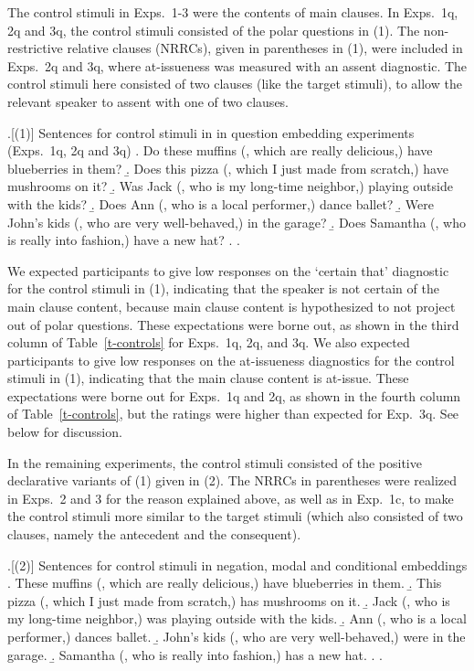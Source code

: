 \documentclass[a4paper,12pt,twoside]{article}
\begin{document}
    The control stimuli in Exps.~1-3 were the contents of main clauses. In Exps.~1q, 2q and 3q, the control stimuli consisted of the polar questions in (1). The non-restrictive relative clauses (NRRCs), given in parentheses in (1), were included in Exps.~2q and 3q, where at-issueness was measured with an assent diagnostic. The control stimuli here consisted of two clauses (like the target stimuli), to allow the relevant speaker to assent with one of two clauses.

    \ex.[(1)] Sentences for control stimuli in in question embedding experiments (Exps.~1q, 2q and 3q)
      \a. Do these muffins (, which are really delicious,) have blueberries in them?
      \b. Does this pizza (, which I just made from scratch,) have mushrooms on it? 
      \b. Was Jack (, who is my long-time neighbor,) playing outside with the kids? 
      \b. Does Ann (, who is a local performer,) dance ballet?
      \b. Were John's kids (, who are very well-behaved,) in the garage?
      \b. Does Samantha (, who is really into fashion,) have a new hat?
      \z.
    \z.

    We expected participants to give low responses on the `certain that' diagnostic for the control stimuli in (1), indicating that the speaker is not certain of the main clause content, because main clause content is hypothesized to not project out of polar questions. These expectations were borne out, as shown in the third column of Table~\ref{t-controls} for Exps.~1q, 2q, and 3q. We also expected participants to give low responses on the at-issueness diagnostics for the control stimuli in (1), indicating that the main clause content is at-issue. These expectations were borne out for Exps.~1q and 2q, as shown in the fourth column of Table~\ref{t-controls}, but the ratings were higher than expected for Exp.~3q. See below for discussion.

    In the remaining experiments, the control stimuli consisted of the positive declarative variants of (1) given in (2). The NRRCs in parentheses were realized in Exps.~2 and 3 for the reason explained above, as well as in Exp.~1c, to make the control stimuli more similar to the target stimuli (which also consisted of two clauses, namely the antecedent and the consequent).

    \ex.[(2)]  Sentences for control stimuli in negation, modal and conditional embeddings
      \a. These muffins (, which are really delicious,) have blueberries in them.
      \b. This pizza (, which I just made from scratch,) has mushrooms on it. 
      \b. Jack (, who is my long-time neighbor,) was playing outside with the kids. 
      \b. Ann (, who is a local performer,) dances ballet.
      \b. John's kids (, who are very well-behaved,) were in the garage.
      \b. Samantha (, who is really into fashion,) has a new hat.
      \z.
    \z.
\end{document}

